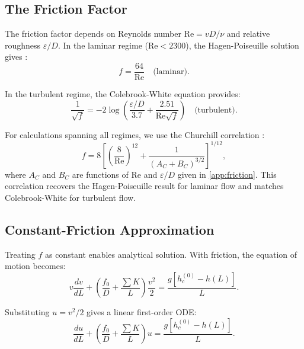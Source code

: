 \documentclass[11pt,a4paper]{article}
\theoremstyle{definition}
\begin{document}
\subsection{The Friction Factor}

The friction factor depends on Reynolds number $\text{Re} = vD/\nu$ and relative roughness $\varepsilon/D$. In the laminar regime ($\text{Re} < 2300$), the Hagen-Poiseuille solution gives \citep{hagen1839,poiseuille1840}:
\begin{equation}
  f = \frac{64}{\text{Re}} \quad \text{(laminar)}.
  \label{eq:f-laminar}
\end{equation}

In the turbulent regime, the Colebrook-White equation \citep{colebrook1939turbulent} provides:
\begin{equation}
  \frac{1}{\sqrt{f}} = -2\log\left(\frac{\varepsilon/D}{3.7} + \frac{2.51}{\text{Re}\sqrt{f}}\right) \quad \text{(turbulent)}.
  \label{eq:colebrook}
\end{equation}

For calculations spanning all regimes, we use the Churchill correlation \citep{churchill1977friction}:
\begin{equation}
  f = 8\left[\left(\frac{8}{\text{Re}}\right)^{12} + \frac{1}{(A_C + B_C)^{3/2}}\right]^{1/12},
  \label{eq:churchill}
\end{equation}
where $A_C$ and $B_C$ are functions of Re and $\varepsilon/D$ given in \cref{app:friction}. This correlation recovers the Hagen-Poiseuille result for laminar flow and matches Colebrook-White for turbulent flow.

\subsection{Constant-Friction Approximation}

Treating $f$ as constant enables analytical solution. With friction, the equation of motion becomes:
\begin{equation}
  v\frac{dv}{dL} + \left(\frac{f_0}{D} + \frac{\sum K}{L}\right)\frac{v^2}{2} = \frac{g[h_c^{(0)} - h(L)]}{L}.
  \label{eq:friction-eom}
\end{equation}

Substituting $u = v^2/2$ gives a linear first-order ODE:
\begin{equation}
  \frac{du}{dL} + \left(\frac{f_0}{D} + \frac{\sum K}{L}\right)u = \frac{g[h_c^{(0)} - h(L)]}{L}.
  \label{eq:u-ODE}
\end{equation}
\end{document}
